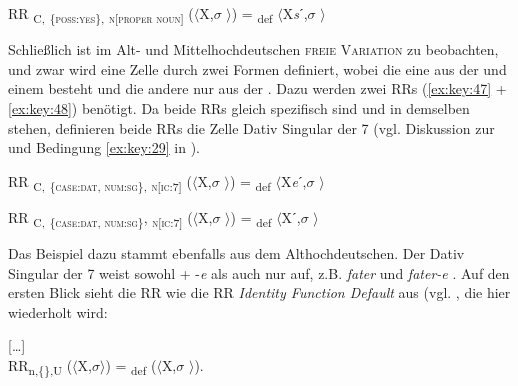 \setcounter{equation}{45}
\ea%
\label{ex:key:46}
 RR \textsubscript{C,} \textsubscript{\{\textsc{poss:yes}\}}\textsubscript{,} \textsubscript{\textsc{n[}\textsc{proper noun}]} ($\langle$X,$\sigma$ $\rangle$) = \textsubscript{def} $\langle$X\textit{s}ˊ,$\sigma$ $\rangle$\\
\z

Schließlich ist im Alt- und Mittelhochdeutschen \textsc{freie Variation} zu beobachten, und zwar wird eine Zelle durch zwei Formen definiert, wobei die eine aus der  und einem  besteht und die andere nur aus der . Dazu werden zwei RRs (\ref{ex:key:47} + \ref{ex:key:48}) benötigt. Da beide RRs gleich spezifisch sind und in demselben  stehen, definieren beide RRs die Zelle Dativ Singular der  7 (vgl. Diskussion zur  und Bedingung \ref{ex:key:29} in ).

\ea%
\label{ex:key:47}
 RR \textsubscript{C,} \textsubscript{\{\textsc{case:dat}, \textsc{num:sg}\},} \textsubscript{\textsc{n[}\textsc{ic:}7]} ($\langle$X,$\sigma$ $\rangle$) = \textsubscript{def} $\langle$X\textit{e}ˊ,$\sigma$ $\rangle$
\z

\ea%
\label{ex:key:48}
 RR \textsubscript{C,} \textsubscript{\{\textsc{case:dat,} \textsc{num:sg}\}}, \textsubscript{\textsc{n[}\textsc{ic:}7]} ($\langle$X,$\sigma$ $\rangle$) = \textsubscript{def} $\langle$Xˊ,$\sigma$ $\rangle$
\z

Das Beispiel dazu stammt ebenfalls aus dem Althochdeutschen. Der Dativ Singular der  7 weist sowohl  +  -\textit{e}  als auch nur   auf, z.B. \textit{fater} und \textit{fater-e} \citep[214]{Braune2004}. Auf den ersten Blick sieht die RR  wie die RR \textit{Identity Function Default} aus (vgl. , die hier wiederholt wird:

\begin{exe}
 […]\\
RR\textsubscript{n,\{\},U} ($\langle$X,$\sigma $$\rangle$) = \textsubscript{def} ($\langle$X,$\sigma$ $\rangle$). \citep[53]{Stump2001}
\end{exe}      

